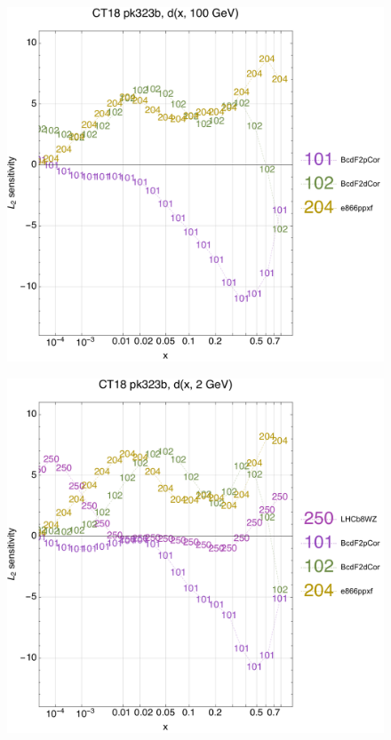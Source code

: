\documentclass[10pt,aps,prd,floatfix,titlepage]{revtex4}
\begin{document}
\clearpage
\begin{figure}
\includegraphics[width=\textwidth,height=0.44\textheight,keepaspectratio]{1/ifl2_ct18nn_L2_q100_Sf_1.pdf}
\caption{}
\end{figure}
\begin{figure}
\includegraphics[width=\textwidth,height=0.44\textheight,keepaspectratio]{1/ifl2_ct18nn_L2_q2_Sf_1.pdf}
\caption{}
\end{figure}
\end{document}
